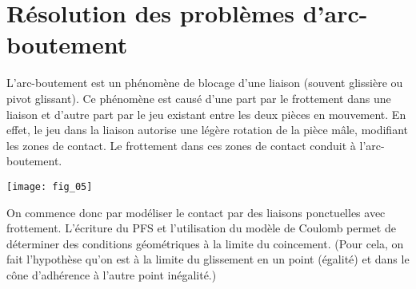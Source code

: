 \section{Résolution des problèmes d'arc-boutement}
L'arc-boutement est un phénomène de blocage d'une liaison (souvent glissière ou pivot glissant). Ce phénomène est causé d'une part par le frottement dans une liaison et d'autre part par le jeu existant entre les deux pièces en mouvement. En effet, le jeu dans la liaison autorise une légère rotation de la pièce mâle, modifiant les zones de contact. Le frottement dans ces zones de contact conduit à l'arc-boutement. 

\begin{center}
\texttt{[image: fig\_05]}
\end{center}

On commence donc par modéliser le contact par des liaisons ponctuelles avec frottement. L'écriture du PFS et l'utilisation du modèle de Coulomb permet de déterminer des conditions géométriques à la limite du coincement. 
(Pour cela, on fait l'hypothèse qu'on est à la limite du glissement en un point (égalité) et dans le cône d'adhérence à l'autre point inégalité.) 